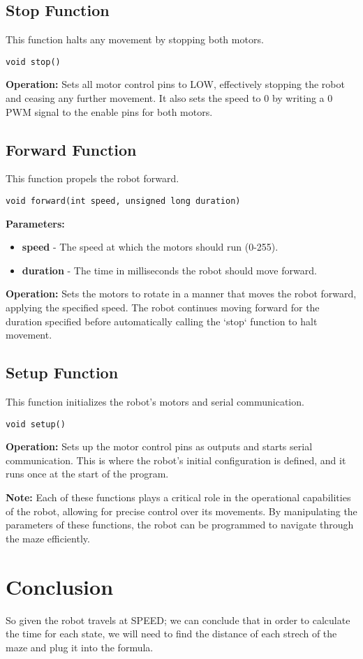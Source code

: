 \documentclass{article} %
\begin{document}
\subsection*{Stop Function}
This function halts any movement by stopping both motors.
\begin{verbatim}
void stop()
\end{verbatim}
\textbf{Operation:} Sets all motor control pins to LOW, effectively stopping the robot and ceasing any further movement. It also sets the speed to 0 by writing a 0 PWM signal to the enable pins for both motors.

\subsection*{Forward Function}
This function propels the robot forward.
\begin{verbatim}
void forward(int speed, unsigned long duration)
\end{verbatim}
\textbf{Parameters:}
\begin{itemize}
    \item \textbf{speed} - The speed at which the motors should run (0-255).
    \item \textbf{duration} - The time in milliseconds the robot should move forward.
\end{itemize}
\textbf{Operation:} Sets the motors to rotate in a manner that moves the robot forward, applying the specified speed. The robot continues moving forward for the duration specified before automatically calling the `stop` function to halt movement.

\subsection*{Setup Function}
This function initializes the robot's motors and serial communication.
\begin{verbatim}
void setup()
\end{verbatim}
\textbf{Operation:} Sets up the motor control pins as outputs and starts serial communication. This is where the robot's initial configuration is defined, and it runs once at the start of the program.

\textbf{Note:} Each of these functions plays a critical role in the operational capabilities of the robot, allowing for precise control over its movements. By manipulating the parameters of these functions, the robot can be programmed to navigate through the maze efficiently.


\section{Conclusion} %
So given the robot travels at SPEED; we can conclude that in order to calculate the time for each state, we will need to find the distance of each strech of the maze and plug it into the formula. 
\end{document}
